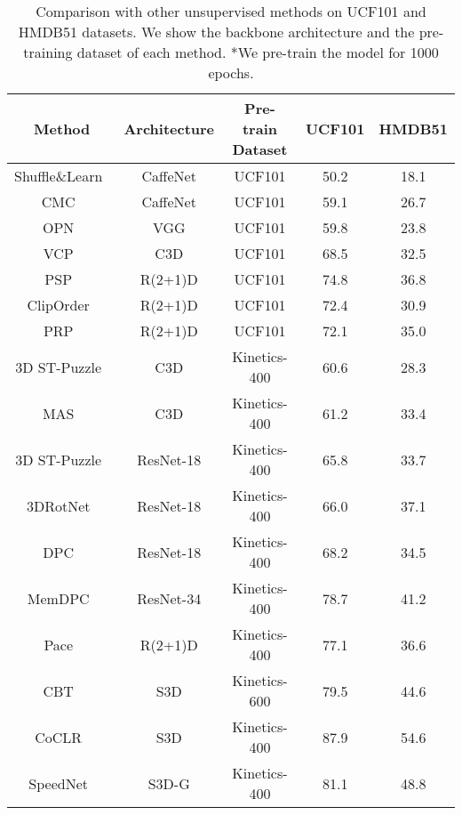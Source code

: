 \documentclass[final]{cvpr}
\begin{document}
\begin{table*}[ht]
	\centering
	\caption{Comparison with other unsupervised methods on UCF101 and HMDB51 datasets. We show the backbone architecture and the pre-training dataset of each method. *We pre-train the model for 1000 epochs.}
	\begin{tabular}{ccccc}
\hline
		Method                & Architecture & Pre-train Dataset      & UCF101 & HMDB51 \\ 
\hline
		Shuffle\&Learn~\cite{misra2016shuffle}  &  CaffeNet   & UCF101       & 50.2   & 18.1   \\
		CMC~\cite{tian2019contrastive} & CaffeNet  & UCF101       & 59.1   & 26.7   \\
		OPN~\cite{lee2017unsupervised} &  VGG      & UCF101       & 59.8   & 23.8   \\
		VCP~\cite{vcp}               & C3D     & UCF101       & 68.5   & 32.5   \\
		PSP~\cite{playbackspeed}     & R(2+1)D     & UCF101       & 74.8   & 36.8   \\
		ClipOrder~\cite{xu2019self}  & R(2+1)D     & UCF101       & 72.4   & 30.9   \\
		PRP~\cite{PRP}               & R(2+1)D     & UCF101       & 72.1   & 35.0   \\
		3D ST-Puzzle~\cite{3dpuzzle} & C3D          & Kinetics-400 & 60.6   & 28.3   \\
		MAS~\cite{WangJBHLL19}       &  C3D        & Kinetics-400 & 61.2   & 33.4   \\
		3D ST-Puzzle~\cite{3dpuzzle} & ResNet-18  & Kinetics-400 & 65.8   & 33.7   \\
		3DRotNet~\cite{jing2018self} & ResNet-18    & Kinetics-400 & 66.0   & 37.1   \\
		DPC~\cite{HanXZ19}           & ResNet-18  & Kinetics-400 & 68.2   & 34.5   \\
		MemDPC~\cite{han2020memdpc}  & ResNet-34       & Kinetics-400 & 78.7   & 41.2   \\
		Pace~\cite{pace}             & R(2+1)D     & Kinetics-400 & 77.1   & 36.6   \\
		CBT~\cite{sun2019learning}   & S3D          & Kinetics-600 & 79.5   & 44.6   \\
		CoCLR~\cite{han2020coclr}    & S3D       & Kinetics-400 & 87.9   & 54.6   \\
		SpeedNet~\cite{speednet}     & S3D-G       & Kinetics-400 & 81.1   & 48.8   \\



\end{tabular}
\end{table*}
\end{document}

